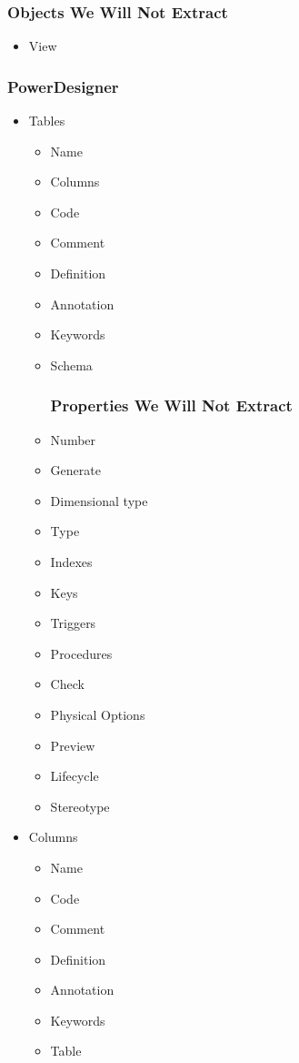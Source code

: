 \documentclass[12pt,a4paper]{report}
\begin{document}
\begin{itemize}
	\subsubsection{Objects We Will Not Extract}
	\begin{itemize}
		\item View
	\end{itemize}
\end{itemize}

\subsubsection{PowerDesigner}

\begin{itemize}
	\item Tables
	\begin{itemize}
		\item Name 
		\item Columns
		\item Code 
		\item Comment
		\item Definition
		\item Annotation
		\item Keywords
		\item Schema
		\subsubsection{Properties We Will Not Extract}
		\item Number
		\item Generate
		\item Dimensional type
		\item Type
		\item Indexes
		\item Keys 
		\item Triggers
		\item Procedures
		\item Check 
		\item Physical Options
		\item Preview
		\item Lifecycle 
		\item Stereotype
	\end{itemize}
	\item Columns
	\begin{itemize}
		\item Name 
		\item Code 
		\item Comment
		\item Definition
		\item Annotation
		\item Keywords
		\item Table

\end{itemize}
\end{itemize}
\end{document}
